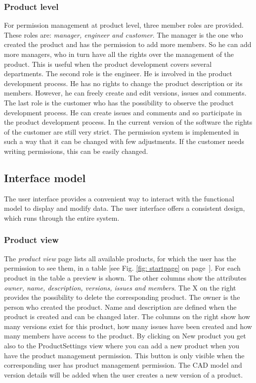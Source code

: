     \subsubsection*{Product level}
    For permission management at product level, three member roles are provided. These roles are: \textit{manager, engineer and customer}. The manager is the one who created the product and has the permission to add more members. So he can add more managers, who in turn have all the rights over the management of the product. This is useful when the product development covers several departments. The second role is the engineer. He is involved in the product development process. He has no rights to change the product description or its members. However, he can freely create and edit versions, issues and comments. The last role is the customer who has the possibility to observe the product development process. He can create issues and comments and so participate in the product development process. In the current version of the software the rights of the customer are still very strict. The permission system is implemented in such a way that it can be changed with few adjustments. If the customer needs writing permissions, this can be easily changed.
    
    \subsection*{Interface model} 
    The user interface provides a convenient way to interact with the functional model to display and modify data. The user interface offers a consistent design, which runs through the entire system.

    \subsubsection*{Product view}
    The \textit{product view} page lists all available products, for which the user has the permission to see them, in a table [see Fig. \ref{fig: startpage} on page~\pageref{fig: startpage}]. For each product in the table a preview is shown. The other columns show the attributes \textit{owner, name, description, versions, issues and members}. The X on the right provides the possibility to delete the corresponding product. The owner is the person who created the product. Name and description are defined when the product is created and can be changed later. The columns on the right show how many versions exist for this product, how many issues have been created and how many members have access to the product. By clicking on New product you get also to the ProductSettings view where you can add a new product when you have the product management permission. This button is only visible when the corresponding user has product management permission. The CAD model and version details will be added when the user creates a new version of a product.

